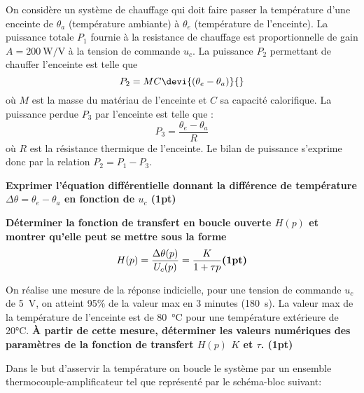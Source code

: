 On considère un système de chauffage qui doit faire passer la température 
d'une enceinte de $\theta_a$  (température ambiante) à $\theta_e$ (température de
l'enceinte). 
La puissance totale $P_1$ fournie à la resistance de chauffage 
est proportionnelle de gain $A=\SI{200}{\watt\per\volt}$ à la tension de commande $u_c$. 
La puissance $P_2$ permettant de chauffer l'enceinte est telle que 
\[
    P_2=MC\devi{(\theta_e-\theta_a)}{}
\]
où $M$ est la masse du matériau de l'enceinte et $C$ sa capacité calorifique.
La puissance perdue $P_3$ par l'enceinte est telle que :
\[
    P_3=\dfrac{\theta_e-\theta_a}{R}
\]
où $R$ est la résistance thermique de l'enceinte.
Le bilan de puissance s'exprime donc par la relation $P_2=P_1-P_3$.

\question{}
\textbf{Exprimer l'équation différentielle donnant la différence de température 
$\Delta\theta=\theta_e-\theta_a$ en fonction de $u_c$
\textbf{(1pt)}}

\question{}
\textbf{Déterminer la fonction de transfert en boucle ouverte $H(p)$ et montrer qu'elle
peut se mettre sous la forme
\[
    H(p)=\dfrac{\Delta\theta(p)}{U_c(p)}=\dfrac{K}{1+\tau p}\text{\textbf{(1pt)}}
\]
}

On réalise une mesure de la réponse indicielle, pour une tension de commande 
$u_c$ de \SI{5}{\volt}, on atteint 95\% de la valeur max en 3 minutes (\SI{180}{\second}).
La valeur max de la température de l'enceinte est de \SI{80}{\celsius} pour une 
température extérieure de 20°C.
\question{}
\textbf{À partir de cette mesure, déterminer les valeurs numériques des paramètres 
de la fonction de transfert $H(p)$ $K$ et $\tau$.
\textbf{(1pt)}}


Dans le but d'asservir la température on boucle le système par un ensemble 
thermocouple-amplificateur tel que représenté par le schéma-bloc suivant:

